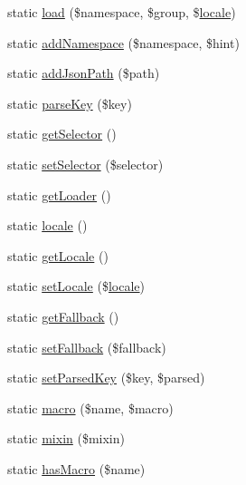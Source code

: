 \begin{DoxyCompactItemize}
\item 
static \mbox{\hyperlink{class_illuminate_1_1_support_1_1_facades_1_1_lang_afb16817981fd372ac47c226b11acba78}{load}} (\$namespace, \$group, \$\mbox{\hyperlink{class_illuminate_1_1_support_1_1_facades_1_1_lang_adf0e7cd50f3430d5e3d7cb161bdfb73c}{locale}})
\item 
static \mbox{\hyperlink{class_illuminate_1_1_support_1_1_facades_1_1_lang_a4fd7b406202d15b9d5e7091a272561f4}{add\+Namespace}} (\$namespace, \$hint)
\item 
static \mbox{\hyperlink{class_illuminate_1_1_support_1_1_facades_1_1_lang_afdbb701cfcbae342151a3feb292a3a47}{add\+Json\+Path}} (\$path)
\item 
static \mbox{\hyperlink{class_illuminate_1_1_support_1_1_facades_1_1_lang_aac2a9b78d2633d1ded279422f448576d}{parse\+Key}} (\$key)
\item 
static \mbox{\hyperlink{class_illuminate_1_1_support_1_1_facades_1_1_lang_a783b77c9beca28357274d4abb92f65ad}{get\+Selector}} ()
\item 
static \mbox{\hyperlink{class_illuminate_1_1_support_1_1_facades_1_1_lang_a99b0d2353fea13c5c8d750daba6c1c10}{set\+Selector}} (\$selector)
\item 
static \mbox{\hyperlink{class_illuminate_1_1_support_1_1_facades_1_1_lang_a681996518ed5da981ade1a58c4c70b25}{get\+Loader}} ()
\item 
static \mbox{\hyperlink{class_illuminate_1_1_support_1_1_facades_1_1_lang_adf0e7cd50f3430d5e3d7cb161bdfb73c}{locale}} ()
\item 
static \mbox{\hyperlink{class_illuminate_1_1_support_1_1_facades_1_1_lang_a86a2fd3dd1b3a5973a5abb1aa7314357}{get\+Locale}} ()
\item 
static \mbox{\hyperlink{class_illuminate_1_1_support_1_1_facades_1_1_lang_aee5fdf1c926d12ee4c071974ad8303e4}{set\+Locale}} (\$\mbox{\hyperlink{class_illuminate_1_1_support_1_1_facades_1_1_lang_adf0e7cd50f3430d5e3d7cb161bdfb73c}{locale}})
\item 
static \mbox{\hyperlink{class_illuminate_1_1_support_1_1_facades_1_1_lang_ab0db39913768af6f4421548ae334ba30}{get\+Fallback}} ()
\item 
static \mbox{\hyperlink{class_illuminate_1_1_support_1_1_facades_1_1_lang_a36c9cbddc88f2629de99fd88097d911b}{set\+Fallback}} (\$fallback)
\item 
static \mbox{\hyperlink{class_illuminate_1_1_support_1_1_facades_1_1_lang_a604716b0f8afe89d3597a81029037fcd}{set\+Parsed\+Key}} (\$key, \$parsed)
\item 
static \mbox{\hyperlink{class_illuminate_1_1_support_1_1_facades_1_1_lang_a0df95ccd871c7765ec279319e3d75556}{macro}} (\$name, \$macro)
\item 
static \mbox{\hyperlink{class_illuminate_1_1_support_1_1_facades_1_1_lang_a683a95badc6642bc4f01b18e07cf4640}{mixin}} (\$mixin)
\item 
static \mbox{\hyperlink{class_illuminate_1_1_support_1_1_facades_1_1_lang_a38c28fa8a1fcb752424e16b536341ce5}{has\+Macro}} (\$name)
\end{DoxyCompactItemize}


